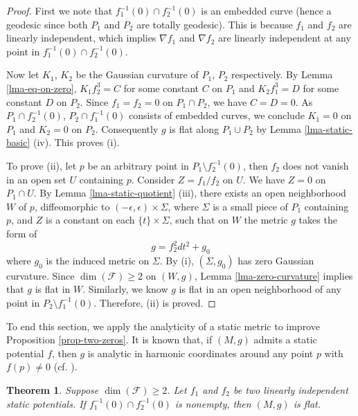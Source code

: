 \documentclass[12pt]{amsart}
\newtheorem{thm}{Theorem}[section]
\theoremstyle{remark}
\numberwithin{equation}{section}
\def\K{\mathcal{F}}
\begin{document}
\begin{proof}
First we note that $ f_1^{-1}(0 ) \cap f_2^{-1} (0) $ is an embedded curve  (hence a geodesic  since both
$P_1$ and $P_2$ are totally geodesic).  This is because $ f_1 $ and $ f_2 $ are linearly independent,  which implies
 $\nabla f_1$ and $\nabla f_2$ are   linearly independent at any point in $ f_1^{-1}(0 ) \cap f_2^{-1} (0) $.


Now let  $ K_1 $, $ K_2$ be the Gaussian curvature of $ P_1 $, $P_2$ respectively.
By  Lemma \ref{lma-eq-on-zero},
$ K_1 f_2^3 = C$  for some constant $C$ on $P_1$ and
$ K_2 f_1^3 = D$ for some constant $D$ on $P_2$.
Since $ f_1 = f_2 = 0 $ on $P_1 \cap P_2$, we have $ C = D = 0 $.
As $P_1 \cap f_2^{-1}(0)$, $P_2 \cap f_1^{-1}(0)$ consists of embedded curves, we conclude $ K_1 = 0 $ on $P_1$
and $K_2 = 0 $ on $P_2$. Consequently $g$ is flat along $P_1 \cup P_2$ by Lemma \ref{lma-static-basic} (iv). This proves (i).

To prove (ii), let  $ p $ be an arbitrary point in $  P_1 \setminus f_2^{-1} (0)$, then  $ f_2  $ does not vanish in an open set $U$ containing $p$.
Consider $ Z = f_1 / f_2 $ on $U$. We have $Z = 0 $ on $P_1 \cap U$.
By Lemma \ref{lma-static-quotient} (iii),  there exists an open
neighborhood $W $ of $p$, diffeomorphic to $ (-\epsilon, \epsilon) \times \Sigma$, where $ \Sigma $ is a small piece of $P_1$ containing $p$,
and
$Z$ is a constant on each $ \{ t \} \times \Sigma$, such that on $W$
the metric $g$  takes  the form of
$$ g = f_2^2 dt^2 + g_0 $$
where $g_0$ is the induced metric on $ \Sigma$.
By  (i), $(\Sigma, g_0)$ has zero Gaussian curvature. Since $\dim (\K) \ge 2$ on $(W, g)$,  Lemma \ref{lma-zero-curvature} implies  that $ g$ is flat in $W$.
Similarly, we know $g$ is flat in an open neighborhood of  any point in $ P_2 \setminus f_1^{-1}(0)$.  Therefore, (ii) is proved.
\end{proof}

To end this section, we apply the analyticity of a static  metric  to improve Proposition \ref{prop-two-zeros}.
It is known that, if $ (M, g)$ admits a static potential $f$, then
$g$ is analytic in harmonic coordinates around any point $p$ with $f(p) \neq 0$ (cf. \cite[Proposition 2.8]{Corvino}).

\begin{thm} \label{thm-local-flat}
Suppose  $ \dim (\K) \ge 2$. Let
 $f_1$ and $ f_2$ be two linearly independent static potentials.
 If $ f_1^{-1} (0) \cap f_2^{-1} (0) $ is nonempty, then
 $(M,g)$ is flat.
\end{thm}
\end{document}
